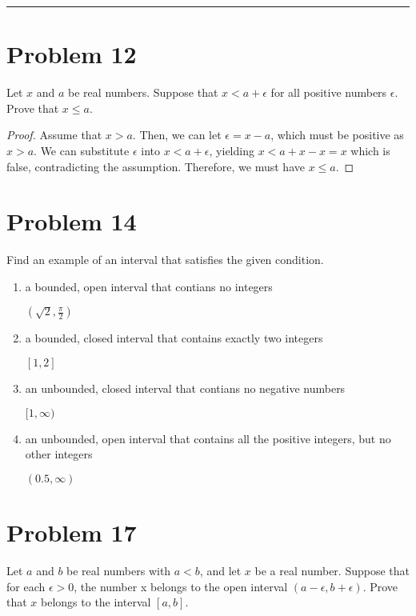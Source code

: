 \documentclass[12pt]{article}
\author{Kiran Jones \\
  \texttt{kiran.p.jones.27@dartmouth.edu}}
\date{Due: July 9, 2025}
\begin{document}
  \maketitle
  \thispagestyle{empty}
  \noindent
  \rule{\linewidth}{0.4pt}
  \newpage
  
  
  \section*{Problem 12}
  \setcounter{page}{1}
  Let $x$ and $a$ be real numbers. Suppose that $x < a + \epsilon$ for all positive numbers $\epsilon$. Prove that $x \leq a$.

  \begin{proof}
    Assume that $x > a$. Then, we can let $\epsilon = x - a$, which must be positive as $x > a$. We can substitute $\epsilon$ into $x < a + \epsilon$, yielding $x < a + x - x = x$ which is false, contradicting the assumption. Therefore, we must have $x \leq a$.
  \end{proof}

  \newpage



  \section*{Problem 14}
  Find an example of an interval that satisfies the given condition.

  \begin{enumerate}[label=(\alph*)]
    \item a bounded, open interval that contians no integers
    
    $(\sqrt{2}, \frac{\pi}{2})$
    \item a bounded, closed interval that contains exactly two integers
    
    $[1, 2]$
    \item an unbounded, closed interval that contians no negative numbers
    
    $[1, \infty)$
    \item an unbounded, open interval that contains all the positive integers, but no other integers
    
    $(0.5, \infty)$
  \end{enumerate}

  \newpage



  \section*{Problem 17}
  Let $a$ and $b$ be real numbers with $a < b$, and let $x$ be a real number. Suppose that for each $\epsilon > 0$, the number x belongs to the open interval $(a - \epsilon, b + \epsilon)$. Prove that $x$ belongs to the interval $[a, b]$.
\end{document}
